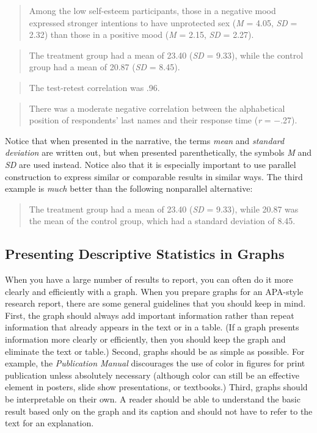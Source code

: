 \documentclass[
]{krantz}
\begin{document}
\begin{quote}
Among the low self-esteem participants, those in a negative mood expressed stronger intentions to have unprotected sex (\emph{M} = 4.05, \emph{SD} = 2.32) than those in a positive mood (\emph{M} = 2.15, \emph{SD} = 2.27).
\end{quote}

\begin{quote}
The treatment group had a mean of 23.40 (\emph{SD} = 9.33), while the control group had a mean of 20.87 (\emph{SD} = 8.45).
\end{quote}

\begin{quote}
The test-retest correlation was .96.
\end{quote}

\begin{quote}
There was a moderate negative correlation between the alphabetical position of respondents' last names and their response time (\emph{r} = −.27).
\end{quote}

Notice that when presented in the narrative, the terms \emph{mean} and \emph{standard deviation} are written out, but when presented parenthetically, the symbols \emph{M} and \emph{SD} are used instead. Notice also that it is especially important to use parallel construction to express similar or comparable results in similar ways. The third example is \emph{much} better than the following nonparallel alternative:

\begin{quote}
The treatment group had a mean of 23.40 (\emph{SD} = 9.33), while 20.87 was the mean of the control group, which had a standard deviation of 8.45.
\end{quote}

\hypertarget{presenting-descriptive-statistics-in-graphs}{%
\subsection*{Presenting Descriptive Statistics in Graphs}\label{presenting-descriptive-statistics-in-graphs}}


When you have a large number of results to report, you can often do it more clearly and efficiently with a graph. When you prepare graphs for an APA-style research report, there are some general guidelines that you should keep in mind. First, the graph should always add important information rather than repeat information that already appears in the text or in a table. (If a graph presents information more clearly or efficiently, then you should keep the graph and eliminate the text or table.) Second, graphs should be as simple as possible. For example, the \emph{Publication Manual} discourages the use of color in figures for print publication unless absolutely necessary (although color can still be an effective element in posters, slide show presentations, or textbooks.) Third, graphs should be interpretable on their own. A reader should be able to understand the basic result based only on the graph and its caption and should not have to refer to the text for an explanation.
\end{document}
